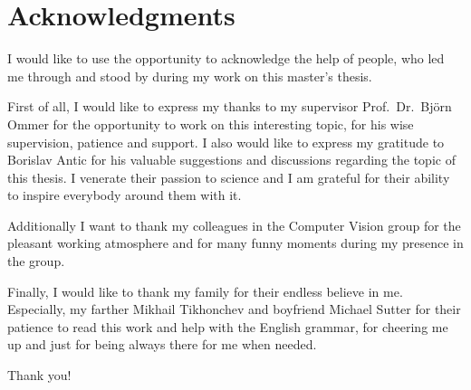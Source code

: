 
\chapter*{Acknowledgments}
\thispagestyle{empty}

I would like to use the opportunity to acknowledge the help of people, who led me through and stood by during my work on this master's thesis.

First of all, I would like to express my thanks to my supervisor Prof.~Dr.~Bj\"{o}rn Ommer for the opportunity to work on this interesting topic, for his wise supervision, patience and support. I also would like to express my gratitude to Borislav Antic for his valuable suggestions and discussions regarding the topic of this thesis. I venerate their passion to science and I am grateful for their ability to inspire everybody around them with it.

Additionally I want to thank my colleagues in the Computer Vision group for the pleasant working atmosphere and for many funny moments during my presence in the group.

Finally, I would like to thank my family for their endless believe in me. Especially, my farther Mikhail Tikhonchev and boyfriend Michael Sutter for their patience to read this work and help with the English grammar, for cheering me up and just for being always there for me when needed.

Thank you!

